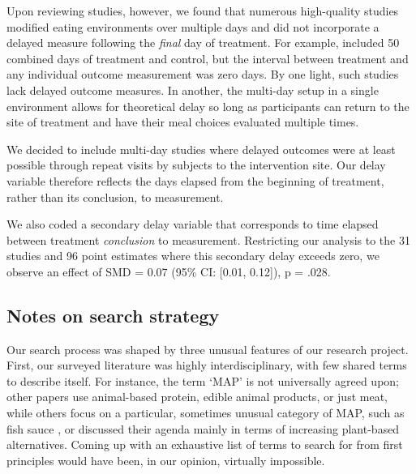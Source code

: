 \documentclass[sn-nature,referee,pdflatex]{sn-jnl}
\begin{document}
Upon reviewing studies, however, we found that numerous high-quality
studies modified eating environments over multiple days and did not
incorporate a delayed measure following the \emph{final} day of
treatment. For example, \citep{andersson2021} included 50 combined days
of treatment and control, but the interval between treatment and any
individual outcome measurement was zero days. By one light, such studies
lack delayed outcome measures. In another, the multi-day setup in a
single environment allows for theoretical delay so long as participants
can return to the site of treatment and have their meal choices
evaluated multiple times.

We decided to include multi-day studies where delayed outcomes were at
least possible through repeat visits by subjects to the intervention
site. Our delay variable therefore reflects the days elapsed from the
beginning of treatment, rather than its conclusion, to measurement.

We also coded a secondary delay variable that corresponds to time
elapsed between treatment \emph{conclusion} to measurement. Restricting
our analysis to the 31 studies and 96 point estimates where this
secondary delay exceeds zero, we observe an effect of SMD = 0.07 (95\%
CI: {[}0.01, 0.12{]}), p = .028.

\subsection{Notes on search strategy}\label{Sec5.2}

Our search process was shaped by three unusual features of our research
project. First, our surveyed literature was highly interdisciplinary,
with few shared terms to describe itself. For instance, the term `MAP'
is not universally agreed upon; other papers use animal-based protein,
edible animal products, or just meat, while others focus on a
particular, sometimes unusual category of MAP, such as fish sauce
\citep{kanchanachitra2020}, or discussed their agenda mainly in terms of
increasing plant-based alternatives. Coming up with an exhaustive list
of terms to search for from first principles would have been, in our
opinion, virtually impossible.
\end{document}

